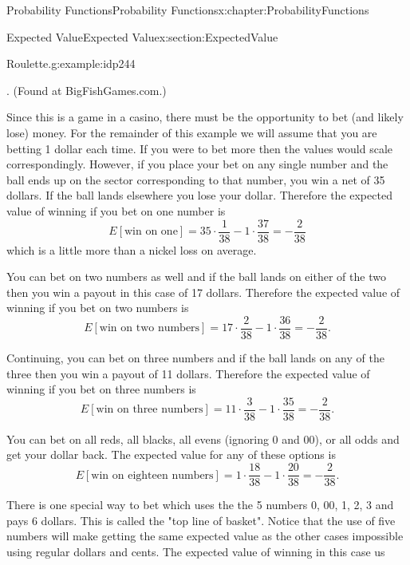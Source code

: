 \documentclass[oneside,10pt,]{book}
\numberwithin{equation}{section}
\begin{document}
\begin{chapterptx}{Probability Functions}{}{Probability Functions}{}{}{x:chapter:ProbabilityFunctions}
\begin{sectionptx}{Expected Value}{}{Expected Value}{}{}{x:section:ExpectedValue}
\begin{example}{Roulette.}{g:example:idp244}
\begin{image}{0}{1}{0}
\end{image}%
. (Found at BigFishGames.com.)%
\par
Since this is a game in a casino, there must be the opportunity to bet (and likely lose) money. For the remainder of this example we will assume that you are betting 1 dollar each time. If you were to bet more then the values would scale correspondingly. However, if you place your bet on any single number and the ball ends up on the sector corresponding to that number, you win a net of 35 dollars.  If the ball lands elsewhere you lose your dollar. Therefore the expected value of winning if you bet on one number is%
\begin{equation*}
E[\text{win on one}] = 35 \cdot \frac{1}{38} - 1 \cdot \frac{37}{38} = - \frac{2}{38}
\end{equation*}
which is a little more than a nickel loss on average.%
\par
You can bet on two numbers as well and if the ball lands on either of the two then you win a payout in this case of 17 dollars.  Therefore the expected value of winning if you bet on two numbers is%
\begin{equation*}
E[\text{win on two numbers}] = 17 \cdot \frac{2}{38} - 1 \cdot \frac{36}{38} = - \frac{2}{38}.
\end{equation*}
%
\par
Continuing, you can bet on three numbers and if the ball lands on any of the three then you win a payout of 11 dollars.  Therefore the expected value of winning if you bet on three numbers is%
\begin{equation*}
E[\text{win on three numbers}] = 11 \cdot \frac{3}{38} - 1 \cdot \frac{35}{38} = - \frac{2}{38}.
\end{equation*}
%
\par
You can bet on all reds, all blacks, all evens (ignoring 0 and 00), or all odds and get your dollar back. The expected value for any of these options is%
\begin{equation*}
E[\text{win on eighteen numbers}] = 1 \cdot \frac{18}{38} - 1 \cdot \frac{20}{38} = - \frac{2}{38}.
\end{equation*}
%
\par
There is one special way to bet which uses the the 5 numbers \textbraceleft{}0, 00, 1, 2, 3\textbraceright{} and pays 6 dollars. This is called the "top line of basket".  Notice that the use of five numbers will make getting the same expected value as the other cases impossible using regular dollars and cents. The expected value of winning in this case us%

\end{example}
\end{sectionptx}
\end{chapterptx}
\end{document}
